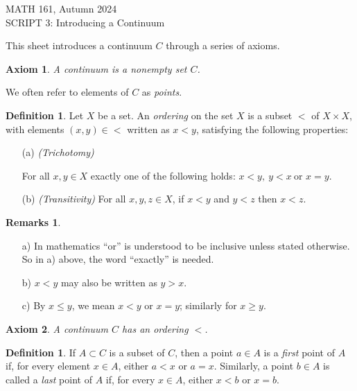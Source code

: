 \documentclass[11pt]{article}
\renewcommand{\_}[1]{\underline{ #1 }}
\newcommand{\head}[1]{
	\begin{center}
		{\large #1}
		\vspace{.2 in}
	\end{center}
	
	\bigskip 
}
\newtheorem{axiom}{Axiom}
\theoremstyle{definition}
\newtheorem{definition}[theorem]{Definition}
\newtheorem{remarks}[theorem]{Remarks}
\numberwithin{equation}{subsection}
\begin{document}
\head{MATH 161, Autumn 2024\\  SCRIPT 3: Introducing a Continuum }




This sheet introduces a continuum $C$ through a series of axioms.


\setcounter{section}{3}   

\begin{axiom} A continuum is a nonempty set $C$.  
\end{axiom}

We often refer to elements of $C$ as \emph{points}.


\begin{definition}  Let $X$ be a set.  An \emph{ordering} on the set $X$ is a subset $<$ of $X \times X$, with elements $(x, y) \in <$ written as $x < y$, satisfying the following properties:

\begin{itemize}
\item[(a)] {\it (Trichotomy) }

For all $x, y \in X$ exactly one of the following holds:
 $x < y,\  y < x\   \text{or } x=y.$ 
\item[(b)] {\it (Transitivity)} For all $x, y, z \in X$, if $x < y$ and $y < z$ then $x < z$.
\end{itemize}
\end{definition}


\begin{remarks}
\begin{enumerate}
\item[a)]  In mathematics ``or'' is understood to be inclusive unless stated otherwise. So in a) above, the word ``exactly'' is needed.
\item[b)] $x<y$ may also be written as $y>x.$
\item[c)] By $x \leq y$, we mean $x < y$ or $x = y$;  similarly for $x \geq y$.
\end{enumerate}
\end{remarks}


\begin{axiom}  A continuum $C$ has an ordering $<$.
\end{axiom}



\begin{definition}  If $A \subset C$ is a subset of $C$, then a point $a \in A$ is a \emph{first} point of $A$ if, for every element $x \in A$, either $a < x$ or $a = x$.  Similarly, a point $b \in A$ is called a \emph{last} point of $A$ if, for every $x \in A$, either $x < b$ or $x = b$.
\end{definition}
\end{document}
